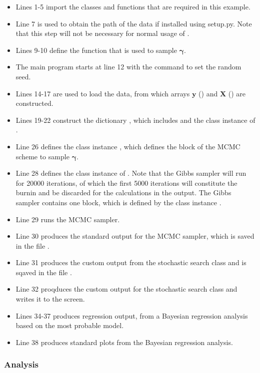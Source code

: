\documentclass[article]{jss}
\begin{document}
\begin{itemize}
\item Lines 1-5 import the classes and functions that are required in
  this example.
\item Line 7 is used to obtain the path of the data if installed
  using setup.py. Note that this step will not be necessary for normal
  usage of .
\item Lines 9-10 define the function that is used to sample
  $\bm{\gamma}.$
\item The main program starts at line 12 with the command to set the random seed.
\item Lines 14-17 are used to load the data, from which arrays
  $\bm{y}$ () and $\bm{X}$ () are constructed.
\item Lines 19-22 construct the dictionary , which includes
   and the class instance of .
\item Line 26 defines the class instance , which defines
  the block of the MCMC scheme to sample $\bm{\gamma}$.
\item Line 28 defines the class instance of . Note that the
  Gibbs sampler will run for 20000 iterations, of which the first 5000
  iterations will constitute the burnin and be discarded for the
  calculations in the output. The Gibbs sampler contains one block,
  which is defined by the class instance .
\item Line 29 runs the MCMC sampler.
\item Line 30 produces the standard output for the MCMC sampler, which
  is saved in the file .
\item Line 31 produces the custom output from the stochastic search
  class and is sqaved in the file .
\item Line 32 proqduces the custom output for the stochastic search
  class and writes it to the screen.
\item Lines 34-37 produces regression output, from a Bayesian
  regression analysis based on the most probable model.
\item Line 38 produces standard plots from the Bayesian regression
  analysis.
\end{itemize}

\subsubsection{Analysis}
\end{document}
